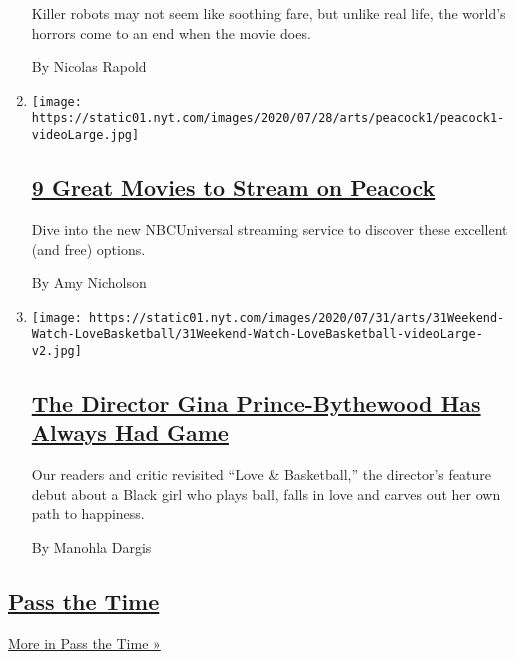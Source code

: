 \begin{enumerate}
  Killer robots may not seem like soothing fare, but unlike real life,
  the world's horrors come to an end when the movie does.

  By Nicolas Rapold
\item
  \texttt{[image: https://static01.nyt.com/images/2020/07/28/arts/peacock1/peacock1-videoLarge.jpg]}

  \hypertarget{9-great-movies-to-stream-on-peacock}{%
  \subsection{\texorpdfstring{\href{/2020/07/29/movies/what-to-stream-on-peacock.html}{9
  Great Movies to Stream on
  Peacock}}{9 Great Movies to Stream on Peacock}}\label{9-great-movies-to-stream-on-peacock}}

  Dive into the new NBCUniversal streaming service to discover these
  excellent (and free) options.

  By Amy Nicholson
\item
  \texttt{[image: https://static01.nyt.com/images/2020/07/31/arts/31Weekend-Watch-LoveBasketball/31Weekend-Watch-LoveBasketball-videoLarge-v2.jpg]}

  \hypertarget{the-director-gina-prince-bythewood-has-always-had-game}{%
  \subsection{\texorpdfstring{\href{/2020/07/28/movies/love-basketball-viewing-party.html}{The
  Director Gina Prince-Bythewood Has Always Had
  Game}}{The Director Gina Prince-Bythewood Has Always Had Game}}\label{the-director-gina-prince-bythewood-has-always-had-game}}

  Our readers and critic revisited ``Love \& Basketball,'' the
  director's feature debut about a Black girl who plays ball, falls in
  love and carves out her own path to happiness.

  By Manohla Dargis
\end{enumerate}

\hypertarget{pass-the-time}{%
\subsection{\texorpdfstring{\href{/spotlight/pass-the-time}{Pass the
Time}}{Pass the Time}}\label{pass-the-time}}

\href{/spotlight/pass-the-time}{More in Pass the Time »}


